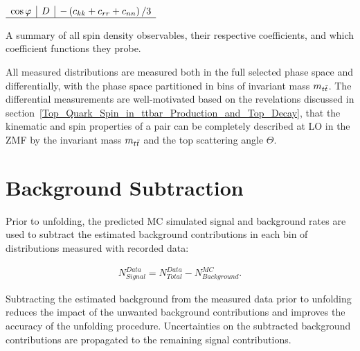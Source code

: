 \begin{table}[htb]
\begin{center}
\begin{adjustbox}{scale=0.85,center}
\begin{math}
\begin{array}{l|l|l}
\cos \varphi & D & -\left(c_{k k}+c_{r r}+c_{n n}\right) / 3 \\
\hline 
\end{array}
\end{math}
\end{adjustbox}
\caption{A summary of all spin density observables, their respective coefficients, and which coefficient functions they probe. 
        }
\label{observables_coefficients}
\end{center}
\end{table}
All measured distributions are measured both in the full selected phase space and differentially, with the phase space partitioned in bins of \ttbar invariant mass $m_{t\bar{t}}$.
The differential measurements are well-motivated based on the revelations discussed in section~\ref{Top_Quark_Spin_in_ttbar_Production_and_Top_Decay}, that the kinematic and spin properties of a \ttbar pair can be completely described at LO in the \ttbar ZMF by the invariant mass $m_{t\bar{t}}$ and the top scattering angle $\Theta$.

\clearpage
\section{Background Subtraction}
\label{Background_Subtraction}
Prior to unfolding, the predicted MC simulated signal and background rates are used to subtract the estimated background contributions in each bin of distributions measured with recorded data:
\begin{linenomath*}
\begin{align}
N^{Data}_{Signal} = N^{Data}_{Total} - N^{MC}_{Background}.
\label{Data_Background_Subtraction}
\end{align}
\end{linenomath*}
Subtracting the estimated background from the measured data prior to unfolding reduces the impact of the unwanted background contributions and improves the accuracy of the unfolding procedure.
Uncertainties on the subtracted background contributions are propagated to the remaining signal contributions.

